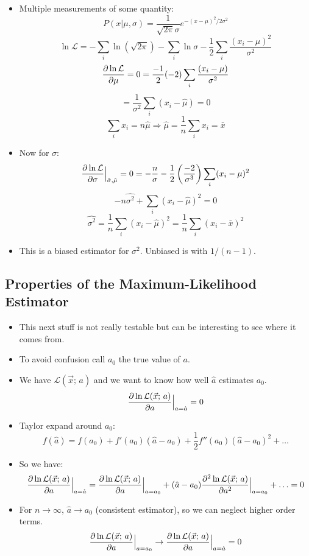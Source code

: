\begin{itemize}
    \item Multiple measurements of some quantity:
          \[ P(x | \mu, \sigma) = \frac{1}{\sqrt{2 \pi} \sigma} e^{-(x - \mu)^2 / 2 \sigma^2} \]
          \[ \ln \mathcal{L} = - \sum_i \ln (\sqrt{2 \pi}) - \sum_i \ln \sigma - \frac{1}{2} \sum_i \frac{(x_i - \mu)^2}{\sigma^2} \]
          \[ \pdv{\ln \mathcal{L}}{\mu} = 0 = \frac{-1}{2} (-2) \sum_i \frac{(x_i - \mu)}{\sigma^2} \]
          \[ = \frac{1}{\sigma^2}  \sum_i (x_i - \hat{\mu}) = 0 \]
          \[ \sum_i x_i = n \hat{\mu} \Rightarrow \hat{\mu} = \frac{1}{n} \sum_i x_i = \bar{x} \]
    \item Now for $\sigma$:
          \[ \pdv{\ln \mathcal{L}}{\sigma}\Big|_{\hat{\sigma}, \hat{\mu}} = 0 = -\frac{n}{\sigma}- \frac{1}{2} \left(\frac{-2}{\sigma^3} \right) \sum_i (x_i - \mu)^2 \]
          \[ -n \hat{\sigma^2} + \sum_i (x_i - \hat{\mu})^2 = 0 \]
          \[ \hat{\sigma^2} = \frac{1}{n} \sum_i (x_i - \hat{\mu})^2  = \frac{1}{n} \sum_i (x_i - \bar{x})^2 \]
    \item This is a biased estimator for $\sigma^2$. Unbiased is with $1/(n-1)$.
\end{itemize}

\subsection{Properties of the Maximum-Likelihood Estimator}

\begin{itemize}
    \item This next stuff is not really testable but can be interesting to see where it comes from.
    \item To avoid confusion call $a_0$ the true value of $a$.
    \item We have $\mathcal{L}(\vec{x}; \, a)$ and we want to know how well $\hat{a}$ estimates $a_0$.
          \[ \pdv{\ln \mathcal{L}(\vec{x}; \, a)}{a} \Big|_{a = \hat{a}} = 0 \]
    \item Taylor expand around $a_0$:
          \[ f(\hat{a}) = f(a_0) + f'(a_0) (\hat{a} - a_0) + \frac{1}{2} f''(a_0) (\hat{a} - a_0)^2 + \ldots \]
    \item So we have:
          \[ \pdv{\ln \mathcal{L}(\vec{x}; \, a)}{a} \Big|_{a = \hat{a}} = \pdv{\ln \mathcal{L}(\vec{x}; \, a)}{a} \Big|_{a = a_0} + (\hat{a} - a_0) \pdv[2]{\ln \mathcal{L}(\vec{x}; \, a)}{a} \Big|_{a = a_0} + \ldots = 0 \]
    \item For $n\rightarrow \infty$, $\hat{a} \rightarrow a_0$ (consistent estimator), so we can neglect higher order terms.
          \[ \pdv{\ln \mathcal{L}(\vec{x}; \, a)}{a} \Big|_{a = a_0} \rightarrow \pdv{\ln \mathcal{L}(\vec{x}; \, a)}{a} \Big|_{a = \hat{a}} = 0 \]
\end{itemize}
